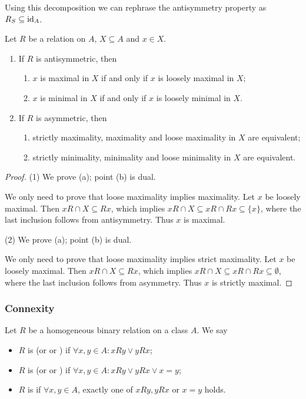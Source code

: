 Using this decomposition we can rephrase the antisymmetry property as $R_S \subseteq \operatorname{id}_A$.

\begin{lemma} \label{symmetricMaximalityMinimality}
Let $R$ be a relation on $A$, $X\subseteq A$ and $x\in X$.
\begin{enumerate}
\item If $R$ is antisymmetric, then
\begin{enumerate}
\item $x$ is maximal in $X$ \textup{if and only if} $x$ is loosely maximal in $X$;
\item $x$ is minimal in $X$ \textup{if and only if} $x$ is loosely minimal in $X$.
\end{enumerate}
\item If $R$ is asymmetric, then
\begin{enumerate}
\item strictly maximality, maximality and loose maximality in $X$ are equivalent;
\item strictly minimality, minimality and loose minimality in $X$ are equivalent.
\end{enumerate}
\end{enumerate}
\end{lemma}
\begin{proof}
(1) We prove (a); point (b) is dual.

We only need to prove that loose maximality implies maximality. Let $x$ be loosely maximal. Then $xR \cap X \subseteq Rx$, which implies $xR\cap X \subseteq xR \cap Rx \subseteq \{x\}$, where the last inclusion follows from antisymmetry. Thus $x$ is maximal.

(2) We prove (a); point (b) is dual.

We only need to prove that loose maximality implies strict maximality. Let $x$ be loosely maximal. Then $xR \cap X \subseteq Rx$, which implies $xR\cap X \subseteq xR \cap Rx \subseteq \emptyset$, where the last inclusion follows from asymmetry. Thus $x$ is strictly maximal.
\end{proof}

\subsubsection{Connexity}
\begin{definition}
Let $R$ be a homogeneous binary relation on a class $A$. We say
\begin{itemize}
\item $R$ is  (or  or ) if $\forall x,y\in A: xRy \lor yRx$;
\item $R$ is  (or  or ) if $\forall x,y\in A: xRy \lor yRx \lor x=y$;
\item $R$ is  if $\forall x,y\in A$, exactly one of $xRy, yRx$ or $x=y$ holds.
\end{itemize}
\end{definition}

